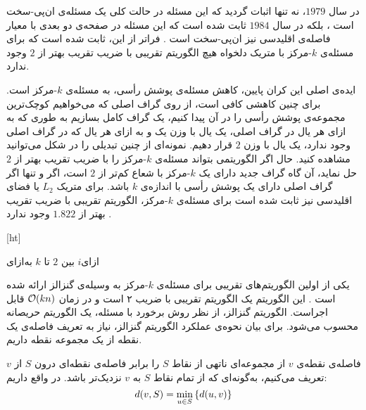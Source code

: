 در سال $1979$، نه تنها اثبات گردید که این مسئله در حالت کلی یک مسئله‌ی ان‌پی-سخت است ، بلکه در سال $1984$ ثابت شده است که این مسئله در صفحه‌ی دو بعدی با معیار فاصله‌ی اقلیدسی نیز ان‌پی-سخت است .
فراتر از این، ثابت شده است که برای مسئله‌ی $k$-مرکز با متریک دلخواه هیچ الگوریتم تقریبی با ضریب تقریب بهتر از $2$ وجود ندارد.

ایده‌ی اصلی این کران پایین، کاهش مسئله‌ی پوشش رأسی، به مسئله‌ی $k$-مرکز است.
برای چنین کاهشی کافی است، از روی گراف اصلی که می‌خواهیم کوچک‌ترین مجموعه‌ی پوشش رأسی را در آن پیدا کنیم، یک گراف کامل بسازیم به طوری که به ازای هر یال در گراف اصلی، یک یال با وزن یک و به ازای هر یال که در گراف اصلی وجود ندارد، یک یال با وزن $2$ قرار دهیم.
نمونه‌ای از چنین تبدیلی را در شکل  می‌توانید مشاهده کنید.
حال اگر الگوریتمی بتواند مسئله‌ی $k$-مرکز را با ضریب تقریب بهتر از $2$ حل نماید، آن گاه گراف جدید دارای یک $k$-مرکز با شعاع کم‌تر از $2$ است، اگر و تنها اگر گراف اصلی دارای یک پوشش رأسی با اندازه‌ی $k$ باشد.
برای متریک $L_2$ یا فضای اقلیدسی نیز ثابت شده است برای مسئله‌ی $k$-مرکز، الگوریتم تقریبی با ضریب تقریب بهتر از $1.822$ وجود ندارد .

[ht]

‌ازای{$i$ بین $2$ تا $k$}
‌به‌ازای

یکی از اولین الگوریتم‌های تقریبی برای مسئله‌ی $k$-مرکز به وسیله‌ی گنزالز ارائه شده است . این الگوریتم یک الگوریتم تقریبی با ضریب ۲ است و در زمان $\mathcal{O}(kn)$ قابل اجراست. الگوریتم گنزالز، از نظر روش برخورد با مسئله، یک الگوریتم حریصانه محسوب می‌شود. برای بیان نحوه‌ی عملکرد الگوریتم گنزالز، نیاز به تعریف فاصله‌ی یک نقطه از یک مجموعه نقطه داریم.

فاصله‌ی نقطه‌ی $v$ از مجموعه‌ای ناتهی از نقاط $S$ را برابر فاصله‌ی نقطه‌ای درون $S$ از $v$ تعریف می‌کنیم، به‌گونه‌ای که از تمام نقاط $S$ به $v$ نزدیک‌تر باشد. در واقع داریم:
$$d(v, S) = \min_{u \in S} \left\{  d(u, v)  \right\}$$

